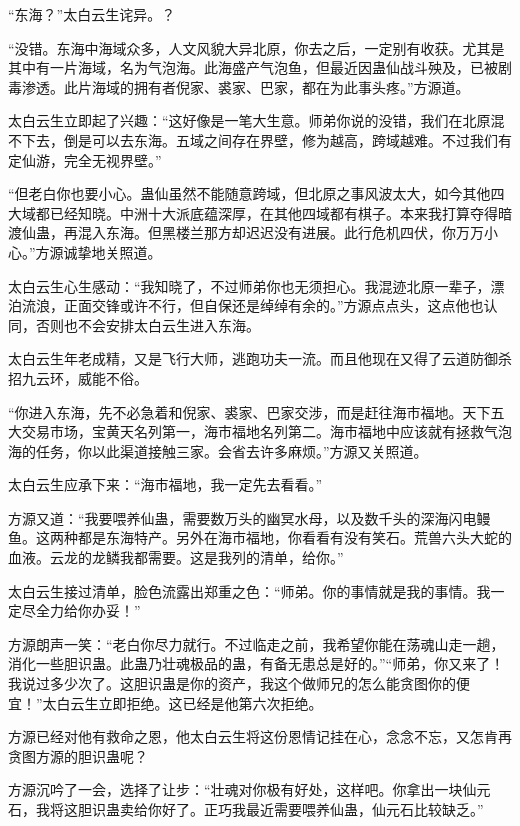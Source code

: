 
\begin{this_body}

“东海？”太白云生诧异。？

“没错。东海中海域众多，人文风貌大异北原，你去之后，一定别有收获。尤其是其中有一片海域，名为气泡海。此海盛产气泡鱼，但最近因蛊仙战斗殃及，已被剧毒渗透。此片海域的拥有者倪家、裘家、巴家，都在为此事头疼。”方源道。

太白云生立即起了兴趣：“这好像是一笔大生意。师弟你说的没错，我们在北原混不下去，倒是可以去东海。五域之间存在界壁，修为越高，跨域越难。不过我们有定仙游，完全无视界壁。”

“但老白你也要小心。蛊仙虽然不能随意跨域，但北原之事风波太大，如今其他四大域都已经知晓。中洲十大派底蕴深厚，在其他四域都有棋子。本来我打算夺得暗渡仙蛊，再混入东海。但黑楼兰那方却迟迟没有进展。此行危机四伏，你万万小心。”方源诚挚地关照道。

太白云生心生感动：“我知晓了，不过师弟你也无须担心。我混迹北原一辈子，漂泊流浪，正面交锋或许不行，但自保还是绰绰有余的。”方源点点头，这点他也认同，否则也不会安排太白云生进入东海。

太白云生年老成精，又是飞行大师，逃跑功夫一流。而且他现在又得了云道防御杀招九云环，威能不俗。

“你进入东海，先不必急着和倪家、裘家、巴家交涉，而是赶往海市福地。天下五大交易市场，宝黄天名列第一，海市福地名列第二。海市福地中应该就有拯救气泡海的任务，你以此渠道接触三家。会省去许多麻烦。”方源又关照道。

太白云生应承下来：“海市福地，我一定先去看看。”

方源又道：“我要喂养仙蛊，需要数万头的幽冥水母，以及数千头的深海闪电鳗鱼。这两种都是东海特产。另外在海市福地，你看看有没有笑石。荒兽六头大蛇的血液。云龙的龙鳞我都需要。这是我列的清单，给你。”

太白云生接过清单，脸色流露出郑重之色：“师弟。你的事情就是我的事情。我一定尽全力给你办妥！”

方源朗声一笑：“老白你尽力就行。不过临走之前，我希望你能在荡魂山走一趟，消化一些胆识蛊。此蛊乃壮魂极品的蛊，有备无患总是好的。”“师弟，你又来了！我说过多少次了。这胆识蛊是你的资产，我这个做师兄的怎么能贪图你的便宜！”太白云生立即拒绝。这已经是他第六次拒绝。

方源已经对他有救命之恩，他太白云生将这份恩情记挂在心，念念不忘，又怎肯再贪图方源的胆识蛊呢？

方源沉吟了一会，选择了让步：“壮魂对你极有好处，这样吧。你拿出一块仙元石，我将这胆识蛊卖给你好了。正巧我最近需要喂养仙蛊，仙元石比较缺乏。”


\end{this_body}

